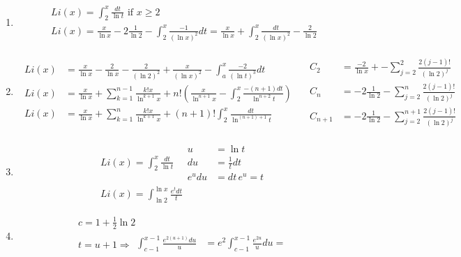 \documentclass[twoside]{amsart}
\theoremstyle{plain}
\theoremstyle{definition}
\newcommand{\exercisehead}[1]
  {\smallskip
   \noindent{\small\bf Exercise #1.}}
\begin{document}
\exercisehead{28} 
\begin{enumerate}
  \item 
\[
\begin{gathered}
  Li(x) = \int_2^x \frac{dt}{ \ln{t} } \text{ if } x \geq 2 \\
  Li(x) = \frac{x}{ \ln{x}} - 2 \frac{1}{ \ln{2} } - \int_2^x \frac{ -1}{ (\ln{x})^2 } dt = \frac{x}{\ln{x}} + \int_2^x \frac{dt}{ (\ln{x})^2 } - \frac{ 2 }{ \ln{2}} 
\end{gathered}
\]
  \item 
\[
\begin{gathered}
  \begin{aligned}
    Li(x) & = \frac{x}{\ln{x}} - \frac{2}{ \ln{x}} - \frac{2}{ (\ln{2})^2} + \frac{x}{ (\ln{x})^2 } - \int_a^x \frac{ -2}{ (\ln{t})^3 }dt \\
    Li(x) & = \frac{x}{\ln{x}} + \sum_{k=1}^{n-1} \frac{ k! x }{ \ln^{k+1}{x} } + n! \left( \frac{x}{ \ln^{n+1}{x}} - \int_2^x \frac{ -(n+1) dt }{ \ln^{n+2}{t} } \right) \\
    Li(x) & = \frac{x}{ \ln{x}} + \sum_{k=1}^n \frac{ k! x }{ \ln^{k+1}{x} } + (n+1)! \int_2^x \frac{dt}{ \ln^{(n+1)+1}{t} }
  \end{aligned}
\quad 
\begin{aligned}
  C_2 & = \frac{-2}{\ln{x}} + - \sum_{j=2}^2 \frac{ 2 (j-1)! }{ (\ln{2})^j } \\
  C_n & = -2 \frac{1}{\ln{2}} - \sum_{j=2}^n \frac{ 2 (j-1)!}{ (\ln{2})^j } \\
  C_{n+1} & = -2 \frac{1}{ \ln{2}} -  \sum_{j=2}^{n+1} \frac{ 2 (j-1)!}{ (\ln{2})^j }
\end{aligned}
\end{gathered}
\]
\item 
\[
\begin{gathered}
  Li(x) = \int_2^x \frac{dt}{ \ln{t}} \quad \begin{aligned} u & = \ln{t} \\ du & = \frac{1}{t} dt \\ e^u du & = dt \, e^u =t \end{aligned}  \\
  \boxed{ Li(x) =\int_{\ln{2}}^{\ln{x}} \frac{ e^t dt }{ t } }
\end{gathered}
\]
\item 
\[
\begin{gathered}
  c = 1 + \frac{1}{2} \ln{2}  \\
  t = u +1 \Longrightarrow \begin{aligned} \int_{c-1}^{x-1} \frac{ e^{2(u+1)} du }{ u }  & = e^2 \int_{c-1}^{x-1} \frac{ e^{2u}}{ u} du = \\ 

\end{aligned}
\end{gathered}\]
\end{enumerate}
\end{document}
